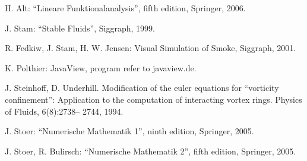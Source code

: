 \documentclass[a4paper,10pt,oneside,final,german,openbib,pdftex,titlepage]{scrbook}
\begin{document}
\begin{appendix}


\renewcommand{\bibname}{\bfont Reference List} 

\begin{thebibliography}{99}

H. Alt: ``Lineare Funktionalanalysis'', fifth edition, Springer, 2006.

J. Stam: ``Stable Fluids'', Siggraph, 1999.

R. Fedkiw, J. Stam, H. W. Jensen: Visual Simulation of Smoke, Siggraph, 2001.

K. Polthier: JavaView, program refer to javaview.de.

J. Steinhoff, D. Underhill. Modification of the euler equations
for “vorticity confinement”: Application to the computation
of interacting vortex rings. Physics of Fluids, 6(8):2738–
2744, 1994.

J. Stoer: ``Numerische Mathematik 1'', ninth edition, Springer, 2005.

J. Stoer, R. Bulirsch: ``Numerische Mathematik 2'', fifth edition, Springer, 2005.

\end{thebibliography}
\end{appendix}
\end{document}
